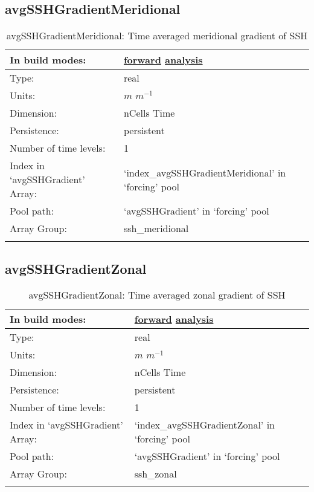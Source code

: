 \subsection[avgSSHGradientMeridional]{avgSSHGradientMeridional}
\label{subsec:var_sec_forcing_avgSSHGradientMeridional}
\begin{center}
\begin{longtable}{| p{2.0in} | p{4.0in} |}
        \hline 
        In build modes: & \hyperref[subsec:forward_var_tab_forcing]{forward} \hyperref[subsec:analysis_var_tab_forcing]{analysis} \\
        \hline 
        Type: & real \\
        \hline 
        Units: & $m$ $m^{-1}$ \\
        \hline 
        Dimension: & nCells Time \\
        \hline 
        Persistence: & persistent \\
        \hline 
        Number of time levels: & 1 \\
        \hline 
		 Index in `avgSSHGradient' Array: & `index\_avgSSHGradientMeridional' in `forcing' pool \\
		 \hline 
            Pool path: & `avgSSHGradient' in `forcing' pool \\
		 \hline 
		 Array Group: & ssh\_meridional \\
		 \hline 
    \caption{avgSSHGradientMeridional: Time averaged meridional gradient of SSH}
\end{longtable}
\end{center}
\subsection[avgSSHGradientZonal]{avgSSHGradientZonal}
\label{subsec:var_sec_forcing_avgSSHGradientZonal}
\begin{center}
\begin{longtable}{| p{2.0in} | p{4.0in} |}
        \hline 
        In build modes: & \hyperref[subsec:forward_var_tab_forcing]{forward} \hyperref[subsec:analysis_var_tab_forcing]{analysis} \\
        \hline 
        Type: & real \\
        \hline 
        Units: & $m$ $m^{-1}$ \\
        \hline 
        Dimension: & nCells Time \\
        \hline 
        Persistence: & persistent \\
        \hline 
        Number of time levels: & 1 \\
        \hline 
		 Index in `avgSSHGradient' Array: & `index\_avgSSHGradientZonal' in `forcing' pool \\
		 \hline 
            Pool path: & `avgSSHGradient' in `forcing' pool \\
		 \hline 
		 Array Group: & ssh\_zonal \\
		 \hline 
    \caption{avgSSHGradientZonal: Time averaged zonal gradient of SSH}
\end{longtable}
\end{center}
